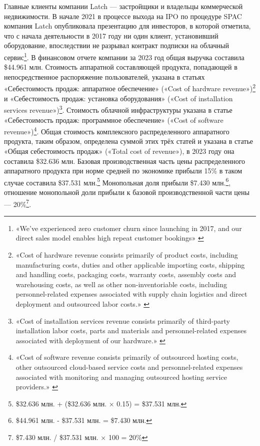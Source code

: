 \documentclass{article}
\begin{document}
Главные клиенты компании Latch — застройщики и владельцы коммерческой недвижимости. В начале 2021 в процессе выхода на IPO по процедуре SPAC компания Latch опубликовала презентацию для инвесторов, в которой отметила, что с начала деятельности в 2017 году ни один клиент, установивший оборудование, впоследствии не разрывал контракт подписки на облачный сервис\footnote{«We've experienced zero customer churn since launching in 2017, and our direct sales model enables high repeat customer bookings» \cite{techcrunchLatchSpacIpo2021, latchSpacInvestorPresentation2021}}. В финансовом отчете компании за 2023 год общая выручка составила \$44.961 млн. Стоимость аппаратной составляющей продукта, попадающей в непосредственное распоряжение пользователей, указана в статьях «Себестоимость продаж: аппаратное обеспечение» («Cost of hardware revenue»)\footnote{«Cost of hardware revenue consists primarily of product costs, including manufacturing costs, duties and other applicable importing costs, shipping and handling costs, packaging costs, warranty costs, assembly costs and warehousing costs, as well as other non-inventoriable costs, including personnel-related expenses associated with supply chain logistics and direct deployment and outsourced labor costs.» \cite{latch10K2023}} и «Себестоимость продаж: установка оборудования» («Cost of installation services revenue»)\footnote{«Cost of installation services revenue consists primarily of third-party installation labor costs, parts and materials and personnel-related expenses associated with deployment of our hardware.» \cite{latch10K2023}}. Стоимость облачной инфраструктуры указана в статье «Себестоимость продаж: программное обеспечение» («Cost of software revenue»)\footnote{«Cost of software revenue consists primarily of outsourced hosting costs, other outsourced cloud-based service costs and personnel-related expenses associated with monitoring and managing outsourced hosting service providers.» \cite{latch10K2023}}. Общая стоимость комплексного распределенного аппаратного продукта, таким образом, определена суммой этих трёх статей и указана в статье «Общая себестоимость продаж» («Total cost of revenue»), в 2023 году она составила \$32.636 млн. Базовая производственная часть цены распределенного аппаратного продукта при норме средней по экономике прибыли 15\% в таком случае составила \$37.531 млн.\footnote{\$32.636 млн. + (\$32.636 млн. × 0.15) = \$37.531 млн.} Монопольная доля прибыли \$7.430 млн.\footnote{\$44.961 млн. - \$37.531 млн. = \$7.430 млн.}, отношение монопольной доли прибыли к базовой производственной части цены — 20\%\footnote{\$7.430 млн. / \$37.531 млн. × 100 = 20\%}.
\end{document}
